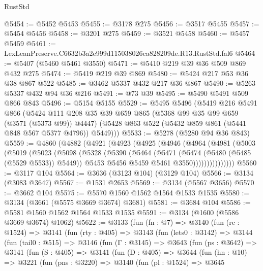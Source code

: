 \begin{lexlean}{RustStd}
\begin{coremodule}
@5454 := @5452 @5453
@5455 := @3178 @275
@5456 := @3517 @5455
@5457 := @5454 @5456
@5458 := @3201 @275
@5459 := @3521 @5458
@5460 := @5457 @5459
@5461 := LexLeanPreserve.C6632b3a2e999d115038026ca828209de.R13.RustStd.fal6
@5464 := @5407 (@5460 @5461 @3550)
@5471 := @5410 @219 @39 @36 @509 @869 @432 @275
@5474 := @5419 @219 @39 @869
@5480 := @5424 @217 @53 @36 @38 @867 @522
@5485 := @3462 @5337 @432 @217 @36 @867
@5490 := @5263 @5337 @432 @94 @36 @216
@5491 := @73 @39
@5495 := @5490 @5491 @509 @866 @843
@5496 := @5154 @5155
@5529 := @5495
    @5496
    (@5419
      @216
      @5491
      @866
      (@5424
        @111
        @208
        @35
        @39
        @659
        @865
        (@5368 @99 @35 @99 @659 (@3571 (@5373 @99)) @4447)
        (@5428 @863 @522 (@5432 @859 @861 (@5441 @848 @567 @5377 @4796)) @5449)))
@5533 := @5278 (@5280 @94 @36 @843)
@5559 := @4860
    (@4882
      (@4921
        (@4923
          (@4925
            (@4946
              (@4964
                (@4981
                  (@5003
                    (@5019
                      (@5023
                        (@5098
                          (@5328
                            (@5390
                              (@5464
                                (@5471
                                  (@5474 (@5480 (@5485 (@5529 @5533)) @5449))
                                  @5453
                                  @5456
                                  @5459
                                  @5461
                                  @3550)))))))))))))))
@5560 := @3117 @104
@5564 := @3636 (@3123 @104) (@3129 @104)
@5566 := @3134 (@3083 @3647)
@5567 := @1531 @2653
@5569 := @3134 (@5567 @3656)
@5570 := @3662 @104
@5575 := @5570 @1560 @1562 @1564 @1533 @1535
@5580 := @3134 (@3661 (@5575 @3669 @3674) @3681)
@5581 := @3684 @104
@5586 := @5581 @1560 @1562 @1564 @1533 @1535
@5591 := @3134 (@1600 (@5586 @3669 @3674) @1062)
@5622 := @3133
    (fun (fn : @7) =>
    @3140
      (fun (rc : @1524) =>
      @3141
        (fun (rty : @405) =>
        @3143
          (fun (lets0 : @3142) =>
          @3144
            (fun (tail0 : @515) =>
            @3146
              (fun (Γ : @3145) =>
              @3643
                (fun (ps : @3642) =>
                @3141
                  (fun (S : @405) =>
                  @3141
                    (fun (D : @405) =>
                    @3644
                      (fun (hn : @10) =>
                      @3221
                        (fun (pns : @3220) =>
                        @3140
                          (fun (pl : @1524) =>
                          @3645

\end{coremodule}
\end{lexlean}
